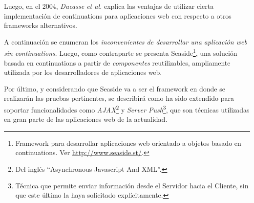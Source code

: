 

Luego, en el 2004, \emph{Ducasse et al.}\cite{Ducasse04} explica las ventajas de utilizar cierta implementación de continuations para aplicaciones web con respecto a otros frameworks alternativos.


A continuación se enumeran los \emph{inconvenientes de desarrollar una aplicación web sin continuations}. Luego, como contraparte se presenta Seaside\footnote{Framework para desarrollar aplicaciones web orientado a objetos basado en continuations. Ver \url{http://www.seaside.st/}.}, una solución basada en continuations a partir de \emph{componentes} reutilizables, ampliamente utilizada por los desarrolladores de aplicaciones web.

Por último, y considerando que Seaside va a ser el framework en donde se realizarán las pruebas pertinentes, se describirá como ha sido extendido para soportar funcionalidades como \emph{AJAX}\footnote{Del inglés ``Asynchronous Javascript And XML''.} y \emph{Server Push}\footnote{Técnica que permite enviar información desde el Servidor hacia el Cliente, sin que este último la haya solicitado explícita\-mente.}, que son técnicas utilizadas en gran parte de las aplicaciones web de la actualidad.



